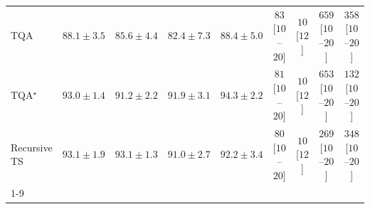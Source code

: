 \begin{tabular}{l|cccc|cccc|}
TQA & {\cellcolor[HTML]{1379B5}} \color[HTML]{F1F1F1} $88.1\pm 3.5$ & {\cellcolor[HTML]{328DBF}} \color[HTML]{F1F1F1} $85.6\pm 4.4$ & {\cellcolor[HTML]{63A2CB}} \color[HTML]{F1F1F1} $82.4\pm 7.3$ & {\cellcolor[HTML]{0F76B3}} \color[HTML]{F1F1F1} $88.4\pm 5.0$ & {\cellcolor[HTML]{FDE4E0}} \color[HTML]{000000} $83$ [$10$--$20$] & {\cellcolor[HTML]{FFF7F3}} \color[HTML]{000000} $10$ [$12$] & {\cellcolor[HTML]{5B006F}} \color[HTML]{F1F1F1} $659$ [$10$--$20$] & {\cellcolor[HTML]{F564A0}} \color[HTML]{F1F1F1} $358$ [$10$--$20$] \\
TQA$^\star$ & {\cellcolor[HTML]{045B8E}} \color[HTML]{F1F1F1} $93.0\pm 1.4$ & {\cellcolor[HTML]{05659F}} \color[HTML]{F1F1F1} $91.2\pm 2.2$ & {\cellcolor[HTML]{046198}} \color[HTML]{F1F1F1} $91.9\pm 3.1$ & {\cellcolor[HTML]{03517E}} \color[HTML]{F1F1F1} $94.3\pm 2.2$ & {\cellcolor[HTML]{FDE4E1}} \color[HTML]{000000} $81$ [$10$--$20$] & {\cellcolor[HTML]{FFF7F3}} \color[HTML]{000000} $10$ [$12$] & {\cellcolor[HTML]{5F0070}} \color[HTML]{F1F1F1} $653$ [$10$--$20$] & {\cellcolor[HTML]{FDD5D1}} \color[HTML]{000000} $132$ [$10$--$20$] \\
Recursive TS & {\cellcolor[HTML]{045B8E}} \color[HTML]{F1F1F1} $93.1\pm 1.9$ & {\cellcolor[HTML]{045B8E}} \color[HTML]{F1F1F1} $93.1\pm 1.3$ & {\cellcolor[HTML]{0566A0}} \color[HTML]{F1F1F1} $91.0\pm 2.7$ & {\cellcolor[HTML]{046096}} \color[HTML]{F1F1F1} $92.2\pm 3.4$ & {\cellcolor[HTML]{FDE4E1}} \color[HTML]{000000} $80$ [$10$--$20$] & {\cellcolor[HTML]{FFF7F3}} \color[HTML]{000000} $10$ [$12$] & {\cellcolor[HTML]{FA9DB4}} \color[HTML]{000000} $269$ [$10$--$20$] & {\cellcolor[HTML]{F76BA2}} \color[HTML]{F1F1F1} $348$ [$10$--$20$] \\
\cline{1-9}
\bottomrule
\end{tabular}
